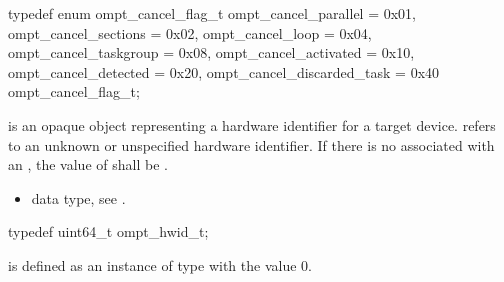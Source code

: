 \begin{ccppspecific}
\begin{omptEnum}
typedef enum ompt_cancel_flag_t {
  ompt_cancel_parallel       = 0x01,
  ompt_cancel_sections       = 0x02,
  ompt_cancel_loop           = 0x04,
  ompt_cancel_taskgroup      = 0x08,
  ompt_cancel_activated      = 0x10,
  ompt_cancel_detected       = 0x20,
  ompt_cancel_discarded_task = 0x40
} ompt_cancel_flag_t;
\end{omptEnum}
\end{ccppspecific}



\label{sec:ompt_hwid_t}
 is an opaque object representing a hardware identifier for a target device.
\label{sec:ompt_hwid_none}
 refers to an unknown or unspecified hardware identifier.
If there is no  associated with an
, the value of  shall be
.

\crossreferences
\begin{itemize}
\item {} data type, see .
\end{itemize}


\begin{ccppspecific}
\begin{omptOther}
typedef uint64_t ompt_hwid_t;
\end{omptOther}
\end{ccppspecific}

 is defined as an instance of type  with the value 
0.



